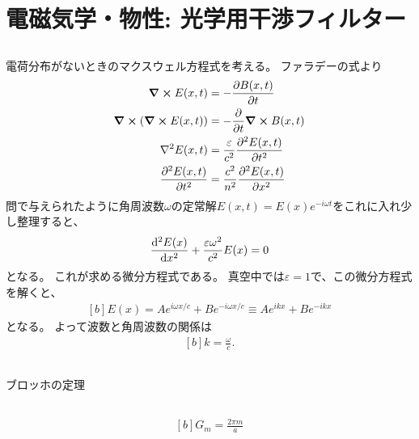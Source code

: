 \documentclass[../ap_2008.tex]{subfiles}
\begin{document}
\chapter{電磁気学・物性: 光学用干渉フィルター}
\section{}
電荷分布がないときのマクスウェル方程式を考える。
ファラデーの式より
\begin{equation}\begin{aligned}[b]
    \curl E(x,t) &= -\pdv{B(x,t)}{t}\\
    \curl (\curl E(x,t)) &= -\pdv{t}\curl B(x,t)\\
    \laplacian E(x,t) &= \frac{\varepsilon}{c^2} \pdv[2]{E(x,t)}{t}\\
    \pdv[2]{E(x,t)}{t} &= \frac{c^2}{n^2}\pdv[2]{E(x,t)}{x}
\end{aligned}\end{equation}
問で与えられたように角周波数\(\omega\)の定常解\(E(x,t)=E(x)e^{-i\omega t}\)をこれに入れ少し整理すると、
\begin{equation}\begin{aligned}[b]
    \dv[2]{E(x)}{x}+\frac{\varepsilon \omega^2}{c^2}E(x)=0
\end{aligned}\end{equation}
となる。
これが求める微分方程式である。
真空中では\(\varepsilon=1\)で、この微分方程式を解くと、
\begin{equation}\begin{aligned}[b]
    E(x) = Ae^{i\omega x/c} + Be^{-i\omega x/c} \equiv Ae^{ikx}+Be^{-ikx}
\end{aligned}\end{equation}
となる。
よって波数と角周波数の関係は
\begin{equation}\begin{aligned}[b]
    k = \frac{\omega}{c}.
\end{aligned}\end{equation}

\section{}
ブロッホの定理

\section{}
\begin{equation}\begin{aligned}[b]
    G_m = \frac{2\pi m}{a}
\end{aligned}\end{equation}
\end{document}
